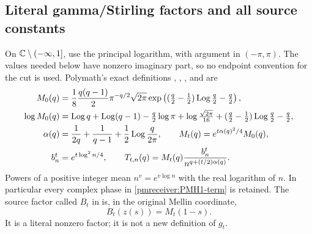 \subsection{Literal gamma/Stirling factors and all source constants}

On $\mathbb C\setminus(-\infty,1]$, use the principal logarithm, with argument
in $(-\pi,\pi)$. The values needed below have nonzero imaginary part,
so no endpoint convention for the cut is used. Polymath's exact
definitions , , , and 
are
\begin{align}
 M_0(q)&=\frac18\frac{q(q-1)}2\pi^{-q/2}\sqrt{2\pi}
 \exp\left((\tfrac q2-\tfrac12)\operatorname{Log}\tfrac q2-\tfrac q2\right),
 \label{pmreceiver:PMH1-M0}\\
 \log M_0(q)&=\operatorname{Log} q+\operatorname{Log}(q-1)-\tfrac q2\log\pi
 +\log\tfrac{\sqrt{2\pi}}{16}
 +(\tfrac q2-\tfrac12)\operatorname{Log}\tfrac q2-\tfrac q2,
 \label{pmreceiver:PMH1-logM}\\
 \alpha(q)&=\frac1{2q}+\frac1{q-1}+\frac12\operatorname{Log}\frac q{2\pi},
 \qquad M_t(q)=e^{t\alpha(q)^2/4}M_0(q),
 \label{pmreceiver:PMH1-alpha}\\
 b_n^t&=e^{t\log^2n/4},\qquad
 T_{t,n}(q)=M_t(q)\frac{b_n^t}{n^{q+(t/2)\alpha(q)}}.
 \label{pmreceiver:PMH1-term}
\end{align}
Powers of a positive integer mean $n^v=e^{v\log n}$ with the real
logarithm of $n$. In particular every complex phase in
\eqref{pmreceiver:PMH1-term} is retained. The source factor called $B_t$ in
 is, in the original Mellin coordinate,
\begin{equation}\label{pmreceiver:PMH1-B}
 B_t(z(s))=M_t(1-s).
\end{equation}
It is a literal nonzero factor; it is not a new definition of $g_t$.


